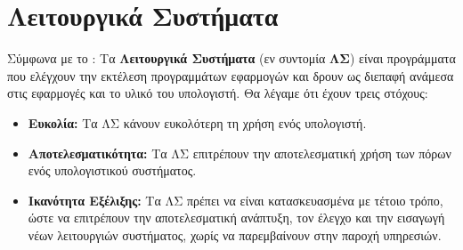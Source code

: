 \section{Λειτουργικά Συστήματα}
\label{sec:os}
Σύμφωνα με το \cite{stallings}: Τα \textbf{Λειτουργικά Συστήματα} (εν συντομία \textbf{ΛΣ}) είναι προγράμματα που ελέγχουν την εκτέλεση προγραμμάτων εφαρμογών και δρουν ως διεπαφή ανάμεσα στις εφαρμογές και το υλικό του υπολογιστή. Θα λέγαμε ότι έχουν τρεις στόχους:
\begin{itemize}
	\item \textbf{Ευκολία:} Τα ΛΣ κάνουν ευκολότερη τη χρήση ενός υπολογιστή.
	\item \textbf{Αποτελεσματικότητα:} Τα ΛΣ επιτρέπουν την αποτελεσματική χρήση των πόρων ενός υπολογιστικού συστήματος.
	\item \textbf{Ικανότητα Εξέλιξης:} Τα ΛΣ πρέπει να είναι κατασκευασμένα με τέτοιο τρόπο, ώστε να επιτρέπουν την αποτελεσματική ανάπτυξη, τον έλεγχο και την εισαγωγή νέων λειτουργιών συστήματος, χωρίς να παρεμβαίνουν στην παροχή υπηρεσιών.
\end{itemize}

